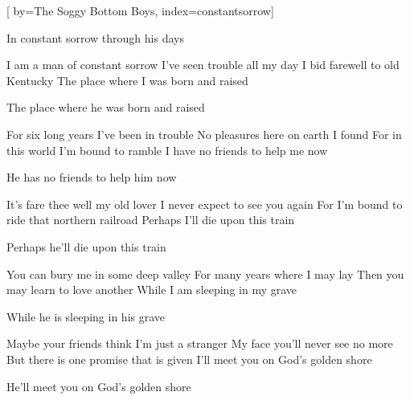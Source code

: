 

[%
    by={The Soggy Bottom Boys},
    index={constantsorrow}]


    \label{constantsorrow}

    \beginchorus
        In constant sorrow through his days
    \endchorus

    \beginverse
        I am a man of constant sorrow
        I've seen trouble all my day
        I bid farewell to old Kentucky
        The place where I was born and raised
    \endverse

    \beginchorus
        The place where he was born and raised
    \endchorus

    \beginverse
        For six long years I've been in trouble
        No pleasures here on earth I found
        For in this world I'm bound to ramble
        I have no friends to help me now
    \endverse

    \beginchorus
        He has no friends to help him now
    \endchorus

    \beginverse
        It's fare thee well my old lover
        I never expect to see you again
        For I'm bound to ride that northern railroad
        Perhaps I'll die upon this train
    \endverse

    \beginchorus
        Perhaps he'll die upon this train
    \endchorus

    \beginverse
        You can bury me in some deep valley
        For many years where I may lay
        Then you may learn to love another
        While I am sleeping in my grave
    \endverse

    \beginchorus
        While he is sleeping in his grave
    \endchorus

    \beginverse
        Maybe your friends think I'm just a stranger
        My face you'll never see no more
        But there is one promise that is given
        I'll meet you on God's golden shore
    \endverse

    \beginchorus
        He'll meet you on God's golden shore
    \endchorus
\endsong
